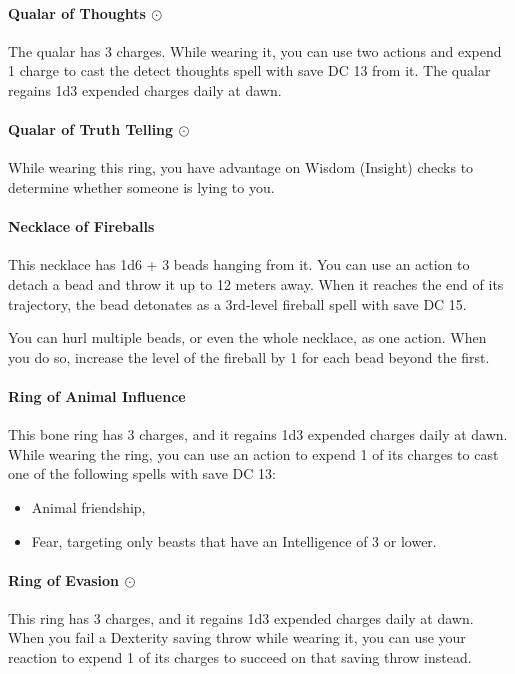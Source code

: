     \paragraph{Qualar of Thoughts $\odot$}
        The qualar has 3 charges.
        While wearing it, you can use two actions and expend 1 charge to cast the detect thoughts spell with save DC 13 from it.
        The qualar regains 1d3 expended charges daily at dawn.
    \paragraph{Qualar of Truth Telling $\odot$}
        While wearing this ring, you have advantage on Wisdom (Insight) checks to determine whether someone is lying to you.
    \paragraph{Necklace of Fireballs}
        This necklace has 1d6 + 3 beads hanging from it. You can use an action to detach a bead and throw it up to 12 meters away.
        When it reaches the end of its trajectory, the bead detonates as a 3rd-level fireball spell with save DC 15.

        You can hurl multiple beads, or even the whole necklace, as one action.
        When you do so, increase the level of the fireball by 1 for each bead beyond the first.
    \paragraph{Ring of Animal Influence}
        This bone ring has 3 charges, and it regains 1d3 expended charges daily at dawn.
        While wearing the ring, you can use an action to expend 1 of its charges to cast one of the following spells with save DC 13:
        \begin{itemize}
            \item Animal friendship,
            \item Fear, targeting only beasts that have an Intelligence of 3 or lower.
        \end{itemize}
    \paragraph{Ring of Evasion $\odot$}
        This ring has 3 charges, and it regains 1d3 expended charges daily at dawn.
        When you fail a Dexterity saving throw while wearing it, you can use your reaction to expend 1 of its charges to succeed on that saving throw instead.
